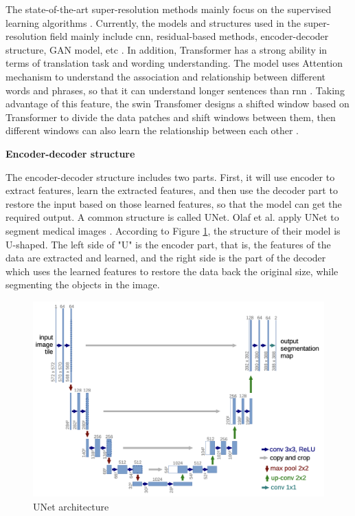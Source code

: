 
The state-of-the-art super-resolution methods mainly focus on the supervised learning algorithms \cite{wang_deep_2021}. Currently, the models and structures used in the super-resolution field mainly include \gls{cnn}, residual-based methods, encoder-decoder structure, GAN model, etc \cite{wang_deep_2021}. In addition, Transformer has a strong ability in terms of translation task and wording understanding. The model uses Attention mechanism to understand the association and relationship between different words and phrases, so that it can understand longer sentences than \gls{rnn} \cite{vaswani_attention_2023}. Taking advantage of this feature, the \gls{swin} Transfomer designs a shifted window based on Transformer to divide the data patches and shift windows between them, then different windows can also learn the relationship between each other \cite{liu_swin_2021}.

\begin{spacing}{1.5}
\textbf{\large{Encoder-decoder structure}}
\end{spacing}

The encoder-decoder structure includes two parts. First, it will use encoder to extract features, learn the extracted features, and then use the decoder part to restore the input based on those learned features, so that the model can get the required output. A common structure is called UNet. Olaf et al. apply UNet to segment medical images \cite{ronneberger_u-net_2015}. According to Figure \ref{unet architecture}, the structure of their model is U-shaped. The left side of "U" is the encoder part, that is, the features of the data are extracted and learned, and the right side is the part of the decoder which uses the learned features to restore the data back the original size, while segmenting the objects in the image.

\begin{figure}
	\centering
	\includegraphics[scale=.5]{figures/unet_paper.png}
	\caption{UNet architecture \cite{ronneberger_u-net_2015}}
	\label{unet architecture}
\end{figure}

